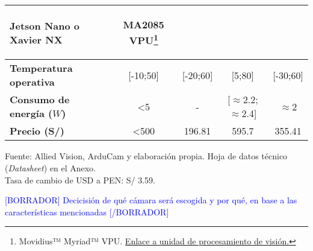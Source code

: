 \begin{itemize}
\begin{savenotes}
\begin{mytable}[H]
\begin{tabular}{l|c|c|c|c|}
\begin{minipage}{\mythirdmaxsizeofcontenttable}
\begin{myflushcenter}
					Jetson Nano o Xavier NX
				\end{myflushcenter}\end{minipage}&
				\begin{minipage}{\mythirdmaxsizeofcontenttable}\begin{myflushcenter}
					MA2085 VPU\footnote{Movidius™ Myriad™ VPU. \href{https://www.intel.com/content/www/us/en/products/processors/movidius-vpu/movidius-myriad-x.html}{Enlace a unidad de procesamiento de visión.}}
				\end{myflushcenter}\end{minipage}  \\ \hline 
				\multicolumn{1}{|l|}{
				\begin{minipage}{\myforthmaxsizeofcontenttable}	
					\textbf{Temperatura operativa}
				\end{minipage}
				} & [-10;50] & [-20;60] & [5;80] & 
	            [-30;60]
	            \\ \hline
				\multicolumn{1}{|l|}{
				\begin{minipage}{\myforthmaxsizeofcontenttable}	
					\textbf{Consumo de energía ($W$)}
				\end{minipage}
				} & <5 & - & [$\approx$2.2;$\approx$2.4] & 
				$\approx$2
				\\ \hline
				\multicolumn{1}{|l|}{
				\begin{minipage}{\myforthmaxsizeofcontenttable}	
					\textbf{Precio (S/)}
				\end{minipage}
				} & <500 & 196.81 & 595.7 & %
				355.41
				\\ \hline
				\end{tabular}
			\begin{flushleft}	
				Fuente: Allied Vision, ArduCam y elaboración propia. Hoja de datos técnico (\textit{Datasheet}) en el Anexo.\\
				Tasa de cambio de USD a PEN: S/ 3.59.
			\end{flushleft}
		\end{mytable}
	\end{savenotes}
	
	\textcolor{blue}{[BORRADOR] Decicisión de qué cámara será escogida y por qué, en base a las características mencionadas [/BORRADOR]}
	
\end{itemize}

